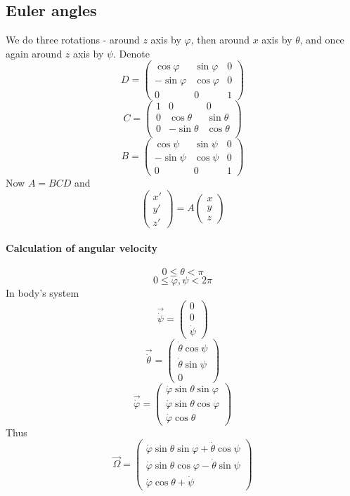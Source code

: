 \subsection{Euler angles}
\begin{center}
	
\end{center}
We do three rotations - around $z$ axis by $\varphi$, then around $x$ axis by $\theta$, and once again around $z$ axis by $\psi$.
Denote
$$D = \begin{pmatrix}
\cos \varphi&\sin \varphi & 0\\
-\sin \varphi & \cos \varphi & 0\\
0&0&1
\end{pmatrix}$$
$$C = \begin{pmatrix}
1&0&0\\
0&\cos \theta&\sin \theta \\
0&-\sin \theta & \cos \theta \\
\end{pmatrix}$$
$$B = \begin{pmatrix}
\cos \psi&\sin \psi & 0\\
-\sin \psi & \cos \psi & 0\\
0&0&1
\end{pmatrix}$$
Now
$A= BCD$
and
$$\begin{pmatrix}
x'\\y'\\z'
\end{pmatrix} = A\begin{pmatrix}
x\\y\\z
\end{pmatrix}$$

\paragraph{Calculation of angular velocity}
$$0\leq \theta < \pi$$
$$0\leq \varphi, \psi < 2\pi$$
In body's system
$$\vec{\dot{\psi}} = \begin{pmatrix}
0\\0\\\dot{\psi}
\end{pmatrix}$$
$$\vec{\dot{\theta}} = \begin{pmatrix}
\dot{\theta}\cos \psi\\\dot{\theta}\sin \psi\\0
\end{pmatrix}$$
$$\vec{\dot{\varphi}} = \begin{pmatrix}
\dot{\varphi}\sin \theta \sin \varphi\\\dot{\varphi}\sin \theta \cos \varphi\\\dot{\varphi} \cos \theta
\end{pmatrix}$$
Thus
$$\vec{\Omega} = \begin{pmatrix}
\dot{\varphi}\sin \theta \sin \varphi+\dot{\theta}\cos \psi\\\dot{\varphi}\sin \theta \cos \varphi-\dot{\theta}\sin \psi\\\dot{\varphi} \cos \theta+\dot{\psi}
\end{pmatrix}$$

